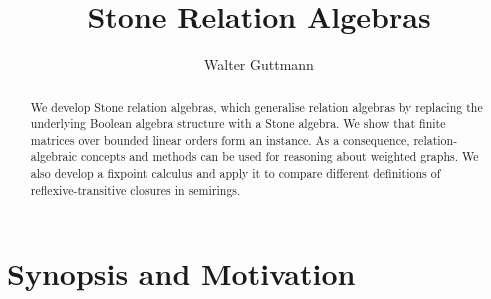 \documentclass[11pt,a4paper]{article}
\begin{document}
\title{Stone Relation Algebras}
\author{Walter Guttmann}
\maketitle

\begin{abstract}
  We develop Stone relation algebras, which generalise relation algebras by replacing the underlying Boolean algebra structure with a Stone algebra.
  We show that finite matrices over bounded linear orders form an instance.
  As a consequence, relation-algebraic concepts and methods can be used for reasoning about weighted graphs.
  We also develop a fixpoint calculus and apply it to compare different definitions of reflexive-transitive closures in semirings.
\end{abstract}

\tableofcontents

\section{Synopsis and Motivation}
\end{document}

